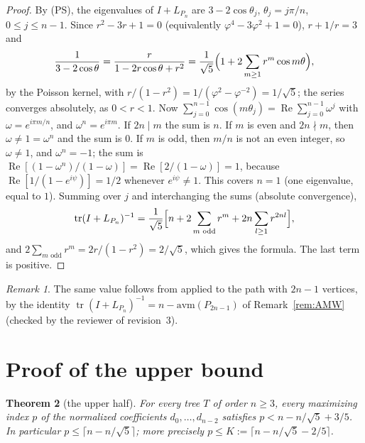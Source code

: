 \documentclass[11pt]{amsart}
\newtheorem{theorem}{Theorem}[section]
\theoremstyle{definition}
\theoremstyle{remark}
\newtheorem{remark}[theorem]{Remark}
\newcommand{\tr}{\operatorname{tr}}
\begin{document}
\begin{proof}
By (PS), the eigenvalues of $I+L_{P_n}$ are $3-2\cos\theta_j$,
$\theta_j=j\pi/n$, $0\le j\le n-1$. Since $r^2-3r+1=0$ (equivalently
$\varphi^4-3\varphi^2+1=0$), $r+1/r=3$ and
\[
\frac1{3-2\cos\theta}=\frac{r}{1-2r\cos\theta+r^2}
=\frac1{\sqrt5}\Bigl(1+2\sum_{m\ge1}r^m\cos m\theta\Bigr),
\]
by the Poisson kernel, with $r/(1-r^2)=1/(\varphi^2-\varphi^{-2})=1/\sqrt5$;
the series converges absolutely, as $0<r<1$. Now
$\sum_{j=0}^{n-1}\cos(m\theta_j)=\operatorname{Re}\sum_{j=0}^{n-1}\omega^j$ with
$\omega=e^{i\pi m/n}$, and $\omega^n=e^{i\pi m}$. If $2n\mid m$ the sum is $n$.
If $m$ is even and $2n\nmid m$, then $\omega\ne1=\omega^n$ and the sum is $0$.
If $m$ is odd, then $m/n$ is not an even integer, so $\omega\ne1$, and
$\omega^n=-1$; the sum is
$\operatorname{Re}[(1-\omega^n)/(1-\omega)]=\operatorname{Re}[2/(1-\omega)]=1$,
because $\operatorname{Re}[1/(1-e^{i\psi})]=1/2$ whenever $e^{i\psi}\ne1$.
This covers $n=1$ (one eigenvalue, equal to $1$). Summing over $j$ and
interchanging the sums (absolute convergence),
\[
\tr(I+L_{P_n})^{-1}=\frac1{\sqrt5}\Bigl[n+2\sum_{m\text{ odd}}r^m+2n\sum_{l\ge1}r^{2nl}\Bigr],
\]
and $2\sum_{m\text{ odd}}r^m=2r/(1-r^2)=2/\sqrt5$, which gives the formula.
The last term is positive.
\end{proof}

\begin{remark}
The same value follows from \cite[Lemma~4.2, eq.~(8)]{AMW} applied to the
path with $2n-1$ vertices, by the identity
$\tr(I+L_{P_n})^{-1}=n-\mathrm{avm}(P_{2n-1})$ of Remark~\ref{rem:AMW} (checked
by the reviewer of revision~3).
\end{remark}

\section{Proof of the upper bound}\label{sec:proof}

\begin{theorem}[the upper half]\label{thm:upper}
For every tree $T$ of order $n\ge3$, every maximizing index $p$ of the
normalized coefficients $d_0,\dots,d_{n-2}$ satisfies $p<n-n/\sqrt5+3/5$. In
particular $p\le\lceil n-n/\sqrt5\rceil$; more precisely
$p\le K:=\lceil n-n/\sqrt5-2/5\rceil$.
\end{theorem}
\end{document}
